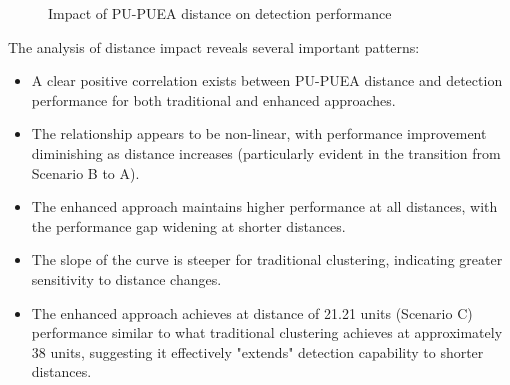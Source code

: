 \begin{figure}[htbp]
    \centering
    \caption{Impact of PU-PUEA distance on detection performance}
    \label{fig:distance_impact}
\end{figure}

The analysis of distance impact reveals several important patterns:

\begin{itemize}
    \item A clear positive correlation exists between PU-PUEA distance and detection performance for both traditional and enhanced approaches.
    
    \item The relationship appears to be non-linear, with performance improvement diminishing as distance increases (particularly evident in the transition from Scenario B to A).
    
    \item The enhanced approach maintains higher performance at all distances, with the performance gap widening at shorter distances.
    
    \item The slope of the curve is steeper for traditional clustering, indicating greater sensitivity to distance changes.
    
    \item The enhanced approach achieves at distance of 21.21 units (Scenario C) performance similar to what traditional clustering achieves at approximately 38 units, suggesting it effectively "extends" detection capability to shorter distances.
\end{itemize}

